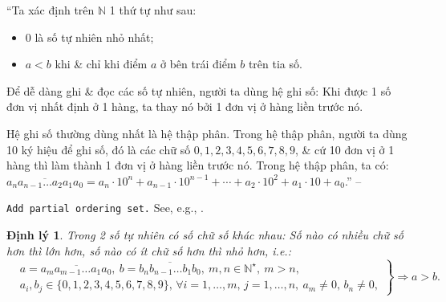 \documentclass{article}
\numberwithin{equation}{section}
\newtheorem{dinhly}{Định lý}[section]
\begin{document}
``Ta xác định trên $\mathbb{N}$ 1 thứ tự như sau:
\begin{itemize}
	\item 0 là số tự nhiên nhỏ nhất;
	\item $a < b$ khi \& chỉ khi điểm $a$ ở bên trái điểm $b$ trên tia số.
\end{itemize}
Để dễ dàng ghi \& đọc các số tự nhiên, người ta dùng hệ ghi số: Khi được 1 số đơn vị nhất định ở 1 hàng, ta thay nó bởi 1 đơn vị ở hàng liền trước nó.

Hệ ghi số thường dùng nhất là hệ thập phân. Trong hệ thập phân, người ta dùng 10 ký hiệu để ghi số, đó là các chữ số $0,1,2,3,4,5,6,7,8,9$, \& cứ 10 đơn vị ở 1 hàng thì làm thành 1 đơn vị ở hàng liền trước nó. Trong hệ thập phân, ta có: $\overline{a_na_{n-1}\ldots a_2a_1a_0} = a_n\cdot 10^n + a_{n-1}\cdot 10^{n-1} + \cdots + a_2\cdot 10^2 + a_1\cdot 10 + a_0$.'' -- \cite{Binh_Toan_6_tap_1}

\texttt{Add partial ordering set.} See, e.g., \cite{Halmos1960, Halmos1974, Kaplansky1972, Kaplansky1977}.

\begin{dinhly}
	Trong 2 số tự nhiên có số chữ số khác nhau: Số nào có nhiều chữ số hơn thì lớn hơn, số nào có ít chữ số hơn thì nhỏ hơn, i.e.:
	\begin{equation}
		\label{compare number of digits}
		\left.\begin{split}
			&a = \overline{a_ma_{m-1}\ldots a_1a_0},\ b = \overline{b_nb_{n-1}\ldots b_1b_0},\ m,n\in\mathbb{N}^\star,\ m > n,\\
			&a_i,b_j\in\{0,1,2,3,4,5,6,7,8,9\},\,\forall i = 1,\ldots,m,\,j = 1,\ldots,n,\ a_m\ne 0,\,b_n\ne 0,
		\end{split}\right\}\Rightarrow a > b.		
	\end{equation}
\end{dinhly}
\end{document}
